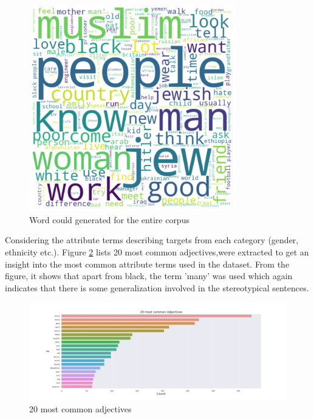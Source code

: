 \begin{figure}[]
    \centering
    \includegraphics[width=0.8\textwidth]{thesis/figures/Overall.png}
    \caption{Word could generated for the entire corpus}
    \label{fig:word clouds}
\end{figure}
\pagebreak
Considering the attribute terms describing targets from each category (gender, ethnicity etc.).  Figure \ref{fig:Common_adj} lists 20 most common adjectives,were extracted to get an insight into the most common attribute terms used in the dataset. From the figure, it shows that apart from black, the term 'many' was used which again indicates that there is some generalization involved in the stereotypical sentences.  

\begin{figure}[]
    \centering
    \includegraphics[width=1\columnwidth]{thesis/figures/20 most common Adjectives.png}
    \caption{20 most common adjectives}
    \label{fig:Common_adj}
\end{figure}